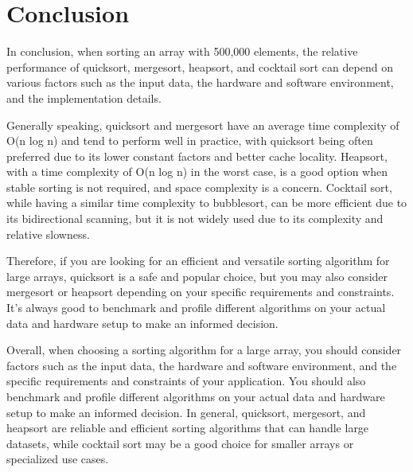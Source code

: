 \chapter*{Conclusion}
In conclusion, when sorting an array with 500,000 elements, the relative performance of quicksort, mergesort, heapsort, and cocktail sort can depend on various factors such as the input data, the hardware and software environment, and the implementation details.

Generally speaking, quicksort and mergesort have an average time complexity of O(n log n) and tend to perform well in practice, with quicksort being often preferred due to its lower constant factors and better cache locality. Heapsort, with a time complexity of O(n log n) in the worst case, is a good option when stable sorting is not required, and space complexity is a concern. Cocktail sort, while having a similar time complexity to bubblesort, can be more efficient due to its bidirectional scanning, but it is not widely used due to its complexity and relative slowness.

Therefore, if you are looking for an efficient and versatile sorting algorithm for large arrays, quicksort is a safe and popular choice, but you may also consider mergesort or heapsort depending on your specific requirements and constraints. It's always good to benchmark and profile different algorithms on your actual data and hardware setup to make an informed decision.

Overall, when choosing a sorting algorithm for a large array, you should consider factors such as the input data, the hardware and software environment, and the specific requirements and constraints of your application. You should also benchmark and profile different algorithms on your actual data and hardware setup to make an informed decision. In general, quicksort, mergesort, and heapsort are reliable and efficient sorting algorithms that can handle large datasets, while cocktail sort may be a good choice for smaller arrays or specialized use cases.


